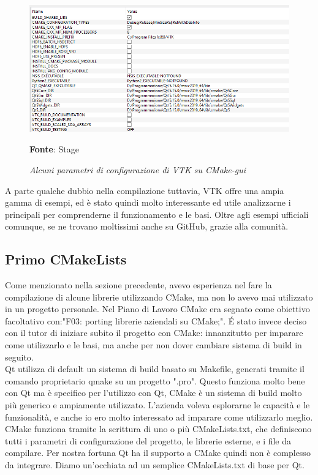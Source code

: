 \begin{figure}[h]
    \centering
    \includegraphics[width=1\textwidth]{immagini/svolgimento/vtkcmake.png}
    \caption{\textit{Alcuni parametri di configurazione di VTK su CMake-gui}}
    \textbf{Fonte}: Stage
    \label{fig: VTK CMAKE}
\end{figure}

A parte qualche dubbio nella compilazione tuttavia, VTK offre una ampia gamma di esempi, ed è stato quindi molto interessante ed utile analizzarne i principali per comprenderne il funzionamento e le basi. Oltre agli esempi ufficiali comunque, se ne trovano moltissimi anche su GitHub, grazie alla comunità.

\subsection{Primo CMakeLists}
Come menzionato nella sezione precedente, avevo esperienza nel fare la compilazione di alcune librerie utilizzando CMake, ma non lo avevo mai utilizzato in un progetto personale. Nel Piano di Lavoro CMake era segnato come obiettivo facoltativo con:"F03: porting librerie aziendali su CMake;". \'E stato invece deciso con il tutor di iniziare subito il progetto con CMake: innanzitutto per imparare come utilizzarlo e le basi, ma anche per non dover cambiare sistema di build in seguito.
\\
Qt utilizza di default un sistema di build basato su Makefile, generati tramite il comando proprietario qmake su un progetto ".pro". Questo funziona molto bene con Qt ma è specifico per l'utilizzo con Qt, CMake è un sistema di build molto più generico e ampiamente utilizzato. L'azienda voleva esplorarne le capacità e le funzionalità, e anche io ero molto interessato ad imparare come utilizzarlo meglio. CMake funziona tramite la scrittura di uno o più CMakeLists.txt, che definiscono tutti i parametri di configurazione del progetto, le librerie esterne, e i file da compilare. Per nostra fortuna Qt ha il supporto a CMake quindi non è complesso da integrare. Diamo un'occhiata ad un semplice CMakeLists.txt di base per Qt.

